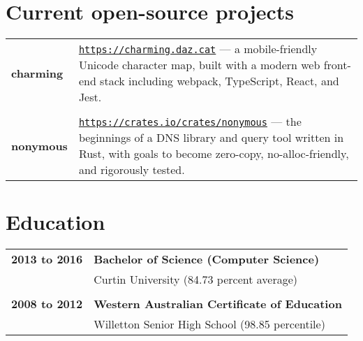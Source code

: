 \documentclass[a4paper,12pt]{article}
\begin{document}
\section*{Current open-source projects}

\begin{tabular}{p{35mm}p{125mm}}
	                    \textbf{charming}           & \texttt{\href{https://charming.daz.cat}{https://charming.daz.cat}} — a mobile-friendly Unicode character map, built with a modern web front-end stack including webpack, TypeScript, React, and Jest.
	\\              \\  \textbf{nonymous}           & \texttt{\href{https://crates.io/crates/nonymous}{https://crates.io/crates/nonymous}} — the beginnings of a DNS library and query tool written in Rust, with goals to become zero-copy, no-alloc-friendly, and rigorously tested.
\end{tabular}



\newpage

\section*{Education}

\begin{tabular}{p{35mm}p{125mm}}
	                    \textbf{2013 to 2016}       & \textbf{Bachelor of Science (Computer Science)}
	\vspace{0.2em}  \\                              & Curtin University (84.73 percent average)
	\\              \\  \textbf{2008 to 2012}       & \textbf{Western Australian Certificate of Education}
	\vspace{0.2em}  \\                              & Willetton Senior High School (98.85 percentile)
\end{tabular}
\end{document}
